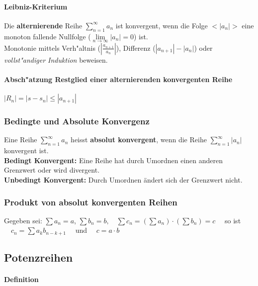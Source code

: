\paragraph{Leibniz-Kriterium}
  Die \textbf{alternierende} Reihe $ \sum\limits_{n=1}^{\infty} a_n $ ist
  konvergent, wenn die Folge $<\left|a_n\right|>$ eine monoton fallende Nullfolge ($\lim\limits_{n \to \infty} \left|a_n\right| = 0 $) ist. \\ Monotonie mittels Verh"altnis ($ \left|\frac{a_{n+1}}{a_n}\right| $),
Differenz ($ |a_{n+1}| - |a_n| $) oder \textit{vollst"andiger Induktion}
beweisen.\\

\paragraph{Absch"atzung Restglied einer alternierenden konvergenten
  Reihe}\qquad $|R_n| = |s-s_n|\leq |a_{n+1}|$


\subsubsection{Bedingte und Absolute Konvergenz}
  Eine Reihe $\sum\limits_{n=1}^{\infty}a_n$ heisst \textbf{absolut konvergent},
wenn die Reihe $\sum\limits_{n=1}^{\infty}|a_n|$ konvergent ist.\\
\textbf{Bedingt Konvergent:} Eine Reihe hat durch Umordnen einen anderen
Grenzwert oder wird divergent.\\
\textbf{Unbedingt Konvergent:} Durch Umordnen \"andert sich der Grenzwert nicht.

\subsubsection{Produkt von absolut konvergenten Reihen} 
  Gegeben sei: $\sum a_n=a$, \quad $\sum b_n=b, \quad \sum c_n = (\sum a_n)
\cdot (\sum b_n) = c \quad $ so ist $ \quad c_n=\sum a_kb_{n-k+1} \quad $ und $ \quad c = a \cdot b $



\subsection{Potenzreihen}

\paragraph{Definition} 

